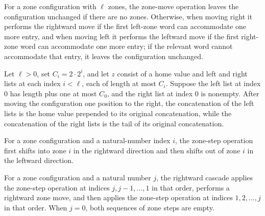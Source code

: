 \begin{definition}
\label{Turing.zoneMove}
\leanok
{}
For a zone configuration with $\ell$ zones, the zone-move operation leaves the
configuration unchanged if there are no zones. Otherwise, when moving right it performs
the rightward move if the first left-zone word can accommodate one more entry, and when
moving left it performs the leftward move if the first right-zone word can accommodate
one more entry; if the relevant word cannot accommodate that entry, it leaves the
configuration unchanged.
\end{definition}

\begin{theorem}
\label{Turing.zoneSide_moveRight}
\leanok
{}
Let $\ell>0$, set $C_i=2\cdot 2^i$, and let $z$ consist of a home value and left and
right lists at each index $i<\ell$, each of length at most $C_i$. Suppose the left list
at index $0$ has length plus one at most $C_0$, and the right list at index $0$ is
nonempty. After moving the configuration one position to the right, the concatenation of
the left lists is the home value prepended to its original concatenation, while the
concatenation of the right lists is the tail of its original concatenation.
\end{theorem}

\begin{definition}
\label{Turing.zoneStepPair}
\leanok
{}
For a zone configuration and a natural-number index $i$, the zone-step operation first
shifts into zone $i$ in the rightward direction and then shifts out of zone $i$ in the
leftward direction.
\end{definition}

\begin{definition}
\label{Turing.zoneCascadeRight}
\leanok
{}
For a zone configuration and a natural number $j$, the rightward cascade applies the
zone-step operation at indices $j,j-1,\ldots,1$ in that order, performs a rightward zone
move, and then applies the zone-step operation at indices $1,2,\ldots,j$ in that order.
When $j=0$, both sequences of zone steps are empty.
\end{definition}

